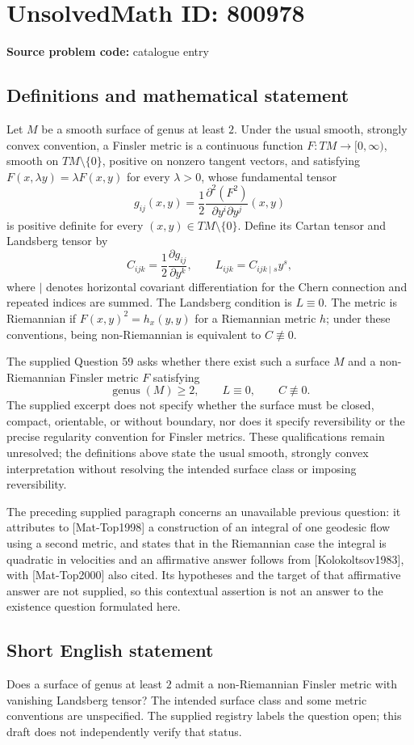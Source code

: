 \documentclass[11pt]{article}
\begin{document}
\section*{UnsolvedMath ID: 800978}
\textbf{Source problem code:} catalogue entry
\subsection{Definitions and mathematical statement}
Let \(M\) be a smooth surface of genus at least \(2\). Under the usual smooth, strongly convex convention, a Finsler metric is a continuous function \(F:TM\to[0,\infty)\), smooth on \(TM\setminus\{0\}\), positive on nonzero tangent vectors, and satisfying \(F(x,\lambda y)=\lambda F(x,y)\) for every \(\lambda>0\), whose fundamental tensor
\[
g_{ij}(x,y)=\frac12\frac{\partial^2(F^2)}{\partial y^i\partial y^j}(x,y)
\]
is positive definite for every \((x,y)\in TM\setminus\{0\}\). Define its Cartan tensor and Landsberg tensor by
\[
C_{ijk}=\frac12\frac{\partial g_{ij}}{\partial y^k},\qquad L_{ijk}=C_{ijk\mid s}y^s,
\]
where \(\mid\) denotes horizontal covariant differentiation for the Chern connection and repeated indices are summed. The Landsberg condition is \(L\equiv0\). The metric is Riemannian if \(F(x,y)^2=h_x(y,y)\) for a Riemannian metric \(h\); under these conventions, being non-Riemannian is equivalent to \(C\not\equiv0\).

The supplied Question 59 asks whether there exist such a surface \(M\) and a non-Riemannian Finsler metric \(F\) satisfying
\[
\operatorname{genus}(M)\ge2,\qquad L\equiv0,\qquad C\not\equiv0.
\]
The supplied excerpt does not specify whether the surface must be closed, compact, orientable, or without boundary, nor does it specify reversibility or the precise regularity convention for Finsler metrics. These qualifications remain unresolved; the definitions above state the usual smooth, strongly convex interpretation without resolving the intended surface class or imposing reversibility.

The preceding supplied paragraph concerns an unavailable previous question: it attributes to [Mat-Top1998] a construction of an integral of one geodesic flow using a second metric, and states that in the Riemannian case the integral is quadratic in velocities and an affirmative answer follows from [Kolokoltsov1983], with [Mat-Top2000] also cited. Its hypotheses and the target of that affirmative answer are not supplied, so this contextual assertion is not an answer to the existence question formulated here.
\subsection{Short English statement}
Does a surface of genus at least \(2\) admit a non-Riemannian Finsler metric with vanishing Landsberg tensor? The intended surface class and some metric conventions are unspecified. The supplied registry labels the question open; this draft does not independently verify that status.
\end{document}
